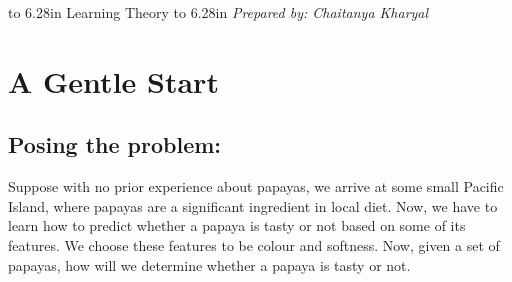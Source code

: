 \documentclass[a4paper]{article}
\begin{document}
\pagestyle{myheadings}
   \thispagestyle{plain}
   \newpage
   \noindent
   \begin{center}
   \framebox
   {
      \vbox{\vspace{2mm}
        \hbox to 6.28in { {\Large \hfill Learning Theory \hfill} } %
        \vspace{2mm}
        \hbox to 6.28in { {\it Prepared by: Chaitanya Kharyal\hfill} } %
        \vspace{2mm}}
   }
   \end{center}
   \markboth{}{} %

\section{A Gentle Start}

\subsection{Posing the problem:}
Suppose with no prior experience about papayas, we arrive at some small Pacific Island, where papayas are a significant ingredient in local diet. Now, we have to learn how to predict whether a papaya is tasty or not based on some of its features. We choose these features to be colour and softness. Now, given a set of papayas, how will we determine whether a papaya is tasty or not.
\end{document}
